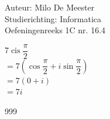 \documentclass[a4paper]{article}
\begin{document}
  
\noindent \large Auteur: Milo De Meester \\
\noindent \large Studierichting: Informatica\\
\noindent \large Oefeningenreeks 1C nr. 16.4\\

\medskip

\normalsize

$7 \operatorname{cis} \dfrac{\pi}{2}$\\

$= 7\left(\cos \dfrac{\pi}{2}+i\sin \dfrac{\pi}{2}\right)$\\

$= 7(0+i)$\\

$= 7i$

\begin{thebibliography}{999}
\end{thebibliography}
\end{document}
